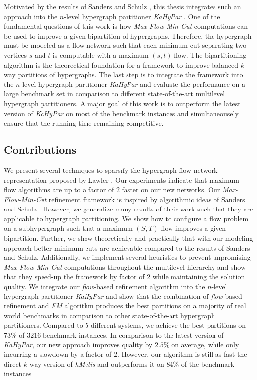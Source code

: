 Motivated by the results of Sanders and Schulz \cite{sanders2011engineering}, this thesis
integrates such an approach into the $n$-level hypergraph partitioner \emph{KaHyPar} \cite{heuer2017improving}.
One of the fundamental questions of this work is how \emph{Max-Flow-Min-Cut} computations
can be used to improve a given bipartition of hypergraphs. Therefore, the hypergraph
must be modeled as a flow network such that each minimum cut separating two vertices
$s$ and $t$ is computable with a maximum $(s,t)$-flow. The bipartitioning algorithm is 
the theorectical foundation for a framework to improve balanced $k$-way partitions of hypergraphs.
The last step is to integrate the framework into the
$n$-level hypergraph partitioner \emph{KaHyPar} \cite{heuer2017improving} and evaluate
the performance on a large benchmark set in comparison to different state-of-the-art 
multilevel hypergraph partitioners. A major goal of this work is to outperform the 
latest version of \emph{KaHyPar} on most of the benchmark instances and simultaneousely
ensure that the running time remaining competitive.

\subsection{Contributions}

We present several techniques to sparsify the hypergraph flow network
representation proposed by Lawler \cite{lawler1973}. Our experiments indicate that
maximum flow algorithms are up to a factor of $2$ faster on our new networks. 
Our \emph{Max-Flow-Min-Cut} refinement framework is inspired by algorithmic ideas of
Sanders and Schulz \cite{sanders2011engineering}. However, we generalize many results of
their work such that they are applicable to hypergraph partitioning. We show how to 
configure a flow problem on a subhypergraph such that a 
maximum $(S,T)$-flow improves a given bipartition. 
Further, we show theoretically and practically that with our modeling approach 
better minimum cuts are achievable compared to the results of Sanders and Schulz.
Additionally, we implement several heuristics to prevent unpromising \emph{Max-Flow-Min-Cut} computations 
throughout the multilevel hierarchy and show that they speed-up the framework by factor
of $2$ while maintaining the solution quality.
We integrate our \emph{flow}-based refinement algorithm into the $n$-level hypergraph partitioner
\emph{KaHyPar} and show that the combination of \emph{flow}-based refinement and
\emph{FM} algorithm produces the best partitions on a majority of real world benchmarks
in comparison to other state-of-the-art hypergraph partitioners. 
Compared to $5$ different systems, we achieve the best partitions on $73\%$ 
of $3216$ benchmark instances. In comparison to the 
latest version of \emph{KaHyPar}, our new approach improves quality by
$2.5\%$ on average, while only incurring a slowdown by a factor of $2$.
However, our algorithm is still as fast the direct $k$-way
version of \emph{hMetis} and outperforms it on $84\%$ of the benchmark instances

